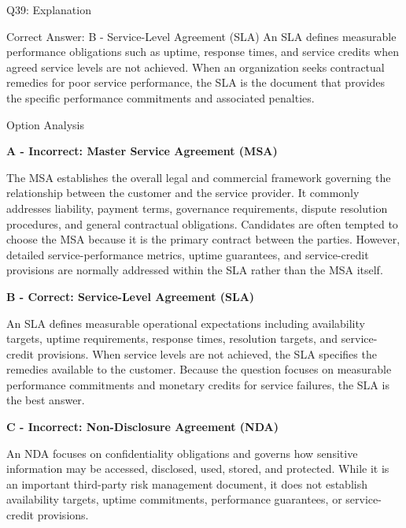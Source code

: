\documentclass{beamer}
\begin{document}
\begin{frame}{Q39: Explanation}
	\begin{block}{Correct Answer: B - Service-Level Agreement (SLA)}
		An SLA defines measurable performance obligations such as uptime,
		response times, and service credits when agreed service levels are
		not achieved. When an organization seeks contractual remedies for
		poor service performance, the SLA is the document that provides
		the specific performance commitments and associated penalties.
	\end{block}
	
	\begin{block}{Option Analysis}
		
		\textbf{A - Incorrect: Master Service Agreement (MSA)}
		
		The MSA establishes the overall legal and commercial framework
		governing the relationship between the customer and the service
		provider. It commonly addresses liability, payment terms,
		governance requirements, dispute resolution procedures, and
		general contractual obligations. Candidates are often tempted
		to choose the MSA because it is the primary contract between the
		parties. However, detailed service-performance metrics, uptime
		guarantees, and service-credit provisions are normally addressed
		within the SLA rather than the MSA itself.
		
		\vspace{0.2cm}
		
		\textbf{B - Correct: Service-Level Agreement (SLA)}
		
		An SLA defines measurable operational expectations including
		availability targets, uptime requirements, response times,
		resolution targets, and service-credit provisions. When service
		levels are not achieved, the SLA specifies the remedies available
		to the customer. Because the question focuses on measurable
		performance commitments and monetary credits for service failures,
		the SLA is the best answer.
		
		\vspace{0.2cm}
		
		\textbf{C - Incorrect: Non-Disclosure Agreement (NDA)}
		
		An NDA focuses on confidentiality obligations and governs how
		sensitive information may be accessed, disclosed, used, stored,
		and protected. While it is an important third-party risk
		management document, it does not establish availability targets,
		uptime commitments, performance guarantees, or service-credit
		provisions.
		

\end{block}
\end{frame}
\end{document}

